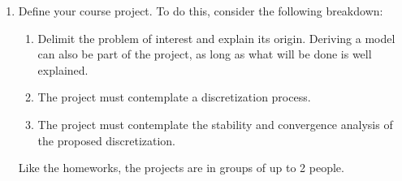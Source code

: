 \documentclass{article}
\begin{document}
\begin{enumerate}
    \item{} Define your course project. To do this, consider the following breakdown: 
            \begin{enumerate}
                \item Delimit the problem of interest and explain its origin. Deriving a model can also be part of the project, as long as what will be done is well explained. 
                \item The project must contemplate a discretization process.
                \item The project must contemplate the stability and convergence analysis of the proposed discretization.
            \end{enumerate}

            Like the homeworks, the projects are in groups of up to 2 people.


\end{enumerate} %
\end{document}
